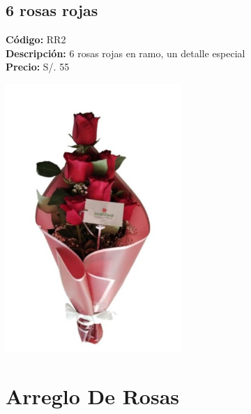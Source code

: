 \subsection*{6 rosas rojas}
\textbf{Código:} RR2 \\
\textbf{Descripción:} 6 rosas rojas en ramo, un detalle especial \\
\textbf{Precio:} S/. 55 \\
\begin{center}
\includegraphics[width=0.5\textwidth]{imagenes_extraidas/image_6_2}
\end{center}
\section*{Arreglo De Rosas}
